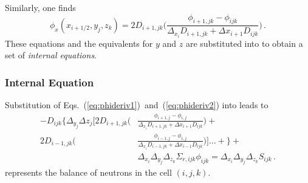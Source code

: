 Similarly, one finds
\begin{equation}
  \phi_x(x_{i+1/2},y_j,z_k) = 
    2D_{i+1,jk} \Bigg ( \frac{\phi_{i+1,jk}-\phi_{ijk}} 
                             {\Delta_{x_i} D_{i+1,jk} + 
                              \Delta x_{i+1} D_{ijk}} 
                \Bigg ) \,  .
\label{eq:phideriv2}
\end{equation}
These equations and the equivalents for $y$ and $z$ 
are substituted into
 to obtain a set of \emph{internal equations}.


\subsubsection{Internal Equation}
Substitution of Eqs.~(\ref{eq:phideriv1})~and~(\ref{eq:phideriv2})
into   leads to
\begin{equation}
\begin{split}
  -D_{ijk} 
   \Bigg \{  
    \Delta_{y_j} \Delta z_j 
    \Bigg [ 
       2D_{i+1,jk} \Bigg (& 
                  \frac{ \phi_{i+1,j}-\phi_{i,j} } 
                       { \Delta_{x_i} D_{i+1,jk} + \Delta x_{i+1} D_{ijk} } 
                  \Bigg ) +  \\
       2D_{i-1,jk} \Bigg (& 
                  \frac{\phi_{i-1,j} - \phi_{i,j}} 
                       { \Delta_{x_i} D_{i-1,jk} + \Delta x_{i-1} D_{ijk} } 
                 \Bigg ) 
    \Bigg ] \ldots + 
   \Bigg \} + \\
   & \Delta_{x_i} \Delta_{y_j} \Delta_{z_k} \Sigma_{r,ijk} \phi_{ijk} 
   = \Delta_{x_i} \Delta_{y_j} \Delta_{z_k} S_{ijk} \, .
\end{split}
\label{eq:inteqs}
\end{equation}  
 represents the balance of neutrons in the
cell $(i,j,k)$.

